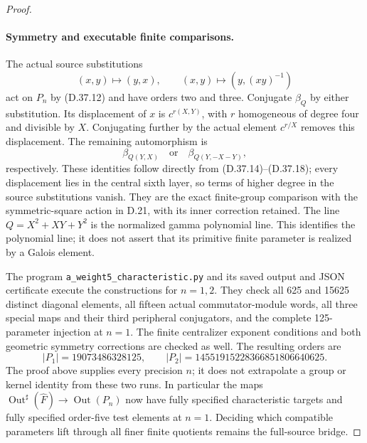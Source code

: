 \begin{proof}
\paragraph{Symmetry and executable finite comparisons.}
The actual source substitutions
\[
 (x,y)\longmapsto(y,x),\qquad
 (x,y)\longmapsto(y,(xy)^{-1})
 \tag{D.37.24}
\]
act on \(P_n\) by \textup{(D.37.12)} and have
orders two and three.  Conjugate \(\beta_Q\)
by either substitution.  Its displacement
of \(x\) is \(c^{r(X,Y)}\), with \(r\)
homogeneous of degree four and divisible
by \(X\).  Conjugating further by the actual
element \(c^{r/X}\) removes this displacement.
The remaining automorphism is
\[
 \beta_{Q(Y,X)}\quad\text{or}\quad
 \beta_{Q(Y,-X-Y)},
 \tag{D.37.25}
\]
respectively.
These identities follow directly from
\textup{(D.37.14)--(D.37.18)}; every
displacement lies in the central sixth
layer, so terms of higher degree in the
source substitutions vanish.
They are the exact finite-group comparison
with the symmetric-square action in D.21,
with its inner correction retained.
The line \(Q=X^2+XY+Y^2\) is the normalized
gamma polynomial line.  This identifies
the polynomial line; it does not assert
that its primitive finite parameter is
realized by a Galois element.

The program
\texttt{a\_weight5\_characteristic.py}
and its saved output and JSON certificate
execute the constructions for \(n=1,2\).
They check all 625 and 15625 distinct
diagonal elements, all fifteen actual
commutator-module words, all three
special maps and their third peripheral
conjugators, and the complete 125-parameter
injection at \(n=1\).
The finite centralizer exponent conditions
and both geometric symmetry corrections
are checked as well.
The resulting orders are
\[
 |P_1|=19073486328125,\qquad
 |P_2|=14551915228366851806640625.
 \tag{D.37.26}
\]
The proof above supplies every precision
\(n\); it does not extrapolate a group
or kernel identity from these two runs.
In particular the maps
\(\operatorname{Out}^{\sharp}(\widehat F)
\to\operatorname{Out}(P_n)\) now have
fully specified characteristic targets
and fully specified order-five test
elements at \(n=1\).
Deciding which compatible parameters
lift through all finer finite quotients
remains the full-source bridge.
\end{proof}
